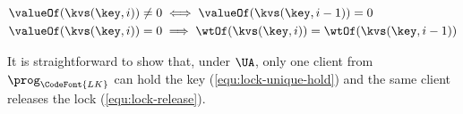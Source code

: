 \spaceshrink{-15pt}
{\displaymathfont
\begin{align}
& \valueOf(\kvs(\key,i)) \neq 0 \iff \valueOf(\kvs(\key,i-1)) = 0
\label{equ:lock-unique-hold}
\\ & \valueOf(\kvs(\key,i)) = 0 \implies \wtOf(\kvs(\key,i)) = \wtOf(\kvs(\key,i-1))
\label{equ:lock-release}
\end{align}
\normalsize}
\spaceshrink{-15pt}

\noindent
It is straightforward to show that, under \( \UA \), 
only one client from \( \prog_{\CodeFont{LK}} \) can hold the key (\cref{equ:lock-unique-hold}) 
and the same client releases the lock (\cref{equ:lock-release}).

